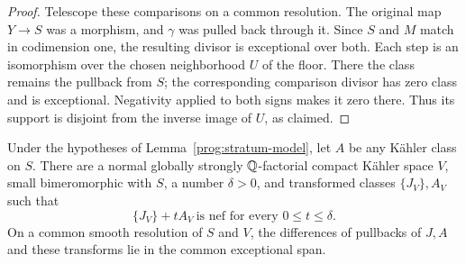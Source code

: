 \begin{proof}
Telescope these comparisons on a common resolution. The original
map \(Y\to S\) was a morphism, and \(\gamma\) was pulled back
through it. Since \(S\) and \(M\) match in codimension one, the
resulting divisor is exceptional over both. Each step is an
isomorphism over the chosen neighborhood \(U\) of the floor.
There the class remains the pullback from \(S\); the corresponding
comparison divisor has zero class and is exceptional. Negativity
applied to both signs makes it zero there. Thus its support is
disjoint from the inverse image of \(U\), as claimed.
\end{proof}

\begin{lemma}\label{prog:nef-interval}
Under the hypotheses of Lemma~\ref{prog:stratum-model}, let \(A\) be any Kähler
class on \(S\).  There are a normal globally strongly
\(\mathbb Q\)-factorial compact Kähler space \(V\), small bimeromorphic
with \(S\), a number \(\delta>0\), and transformed classes
\(\{J_V\},A_V\) such that
\begin{equation}
 \{J_V\}+tA_V\ \text{is nef for every }0\leq t\leq\delta.
 \label{prog:whole-nef-interval}
\end{equation}
On a common smooth resolution of \(S\) and \(V\), the
differences of pullbacks of \(J,A\) and these transforms lie
in the common exceptional span.
\end{lemma}

